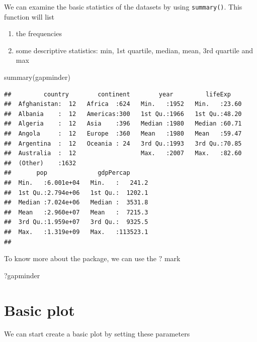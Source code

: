 \documentclass[
]{book}
\makeatletter
\newenvironment{Shaded}{\begin{snugshade}}{\end{snugshade}}
\newcommand{\FunctionTok}[1]{\textcolor[rgb]{0,0,0}{#1}}
\newcommand{\NormalTok}[1]{#1}
\providecommand{\tightlist}{%
  \setlength{\itemsep}{0pt}\setlength{\parskip}{0pt}}
\newenvironment{kframe}{%
\medskip{}
\setlength{\fboxsep}{.8em}
 \def\at@end@of@kframe{}%
 \ifinner\ifhmode%
  \def\at@end@of@kframe{\end{minipage}}%
  \begin{minipage}{\columnwidth}%
 \fi\fi%
 \def\FrameCommand##1{\hskip\@totalleftmargin \hskip-\fboxsep
 \colorbox{shadecolor}{##1}\hskip-\fboxsep
     \hskip-\linewidth \hskip-\@totalleftmargin \hskip\columnwidth}%
 \MakeFramed {\advance\hsize-\width
   \@totalleftmargin\z@ \linewidth\hsize
   \@setminipage}}%
 {\par\unskip\endMakeFramed%
 \at@end@of@kframe}
\renewenvironment{Shaded}{\begin{kframe}}{\end{kframe}}
\makeatother
\begin{document}
We can examine the basic statistics of the datasets by using \texttt{summary()}. This function will list

\begin{enumerate}
\def\labelenumi{\arabic{enumi}.}
\tightlist
\item
  the frequencies
\item
  some descriptive statistics: min, 1st quartile, median, mean, 3rd quartile and max
\end{enumerate}

\begin{Shaded}
\begin{Highlighting}[]
\FunctionTok{summary}\NormalTok{(gapminder)}
\end{Highlighting}
\end{Shaded}

\begin{verbatim}
##         country        continent        year         lifeExp     
##  Afghanistan:  12   Africa  :624   Min.   :1952   Min.   :23.60  
##  Albania    :  12   Americas:300   1st Qu.:1966   1st Qu.:48.20  
##  Algeria    :  12   Asia    :396   Median :1980   Median :60.71  
##  Angola     :  12   Europe  :360   Mean   :1980   Mean   :59.47  
##  Argentina  :  12   Oceania : 24   3rd Qu.:1993   3rd Qu.:70.85  
##  Australia  :  12                  Max.   :2007   Max.   :82.60  
##  (Other)    :1632                                                
##       pop              gdpPercap       
##  Min.   :6.001e+04   Min.   :   241.2  
##  1st Qu.:2.794e+06   1st Qu.:  1202.1  
##  Median :7.024e+06   Median :  3531.8  
##  Mean   :2.960e+07   Mean   :  7215.3  
##  3rd Qu.:1.959e+07   3rd Qu.:  9325.5  
##  Max.   :1.319e+09   Max.   :113523.1  
## 
\end{verbatim}

To know more about the package, we can use the \(?\) mark

\begin{Shaded}
\begin{Highlighting}[]
\NormalTok{?gapminder}
\end{Highlighting}
\end{Shaded}

\hypertarget{basic-plot}{%
\section{Basic plot}\label{basic-plot}}

We can start create a basic plot by setting these parameters
\end{document}
